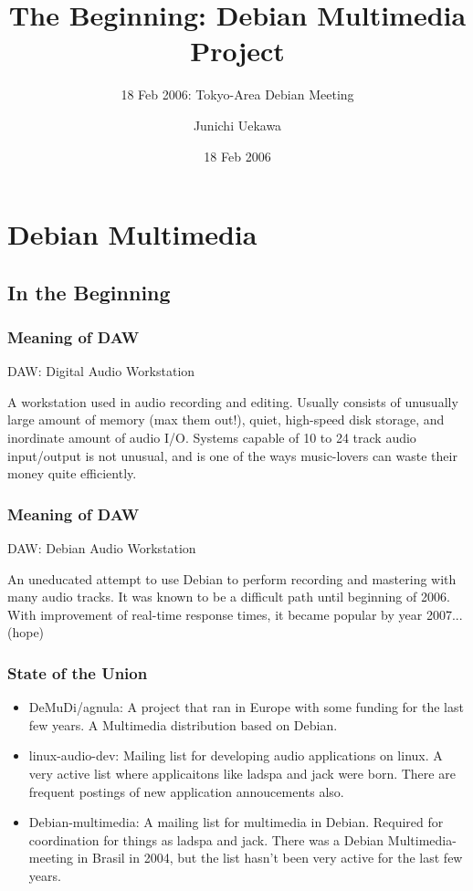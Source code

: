\documentclass[dvipdfm]{beamer}
\title[Tokyo-Area Debian Meeting]{The Beginning: Debian Multimedia Project}
\subtitle{18 Feb 2006: Tokyo-Area Debian Meeting}
\author{Junichi Uekawa}
\date{18 Feb 2006}
\begin{document}
\frame{\titlepage{}}
 
 \section{Debian Multimedia}
 \subsection{In the Beginning}
 \begin{frame}
  \frametitle{Meaning of DAW}
   DAW: Digital Audio Workstation

  A workstation used in audio recording and editing. Usually consists of
  unusually large amount of memory (max them out!), quiet, high-speed
  disk storage, and inordinate amount of audio I/O. Systems capable of
  10 to 24 track audio input/output is not unusual, and is one of the
  ways music-lovers can waste their money quite efficiently.

 \end{frame}
 
 \begin{frame}
  \frametitle{Meaning of DAW}
  DAW: Debian Audio Workstation

An uneducated attempt to use Debian to perform recording and mastering
  with many audio tracks. It was known to be a difficult path until
  beginning of 2006. With improvement of real-time response times, it
  became popular by year 2007... (hope)

 \end{frame}


\begin{frame}
\frametitle{State of the Union}
 \begin{itemize}
  \item DeMuDi/agnula:
	A project that ran in Europe with some funding for the last few
	years.
	A Multimedia distribution based on Debian.
  \item linux-audio-dev: 
	Mailing list for developing audio applications on linux. 
	A very active list where applicaitons like ladspa and jack were born.
	There are frequent postings of new application annoucements also.
  \item Debian-multimedia: A mailing list for multimedia in Debian.
	Required for coordination for things as ladspa and jack.  There
	was a Debian Multimedia-meeting in Brasil in 2004, but the list
	hasn't been very active for the last few years.
 \end{itemize}
\end{frame}
\end{document}
